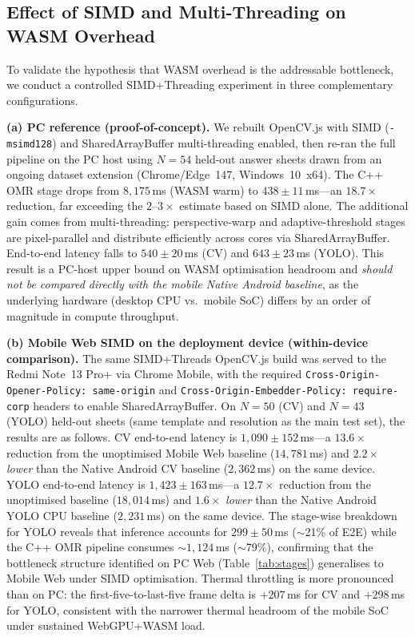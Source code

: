 \documentclass[conference]{IEEEtran}
\begin{document}
\FloatBarrier
\subsection{Effect of SIMD and Multi-Threading on WASM Overhead}

To validate the hypothesis that WASM overhead is the addressable
bottleneck, we conduct a controlled SIMD+Threading experiment in
three complementary configurations.

\textbf{(a) PC reference (proof-of-concept).}
We rebuilt OpenCV.js with SIMD (\texttt{-msimd128}) and
SharedArrayBuffer multi-threading enabled, then re-ran the full
pipeline on the PC host using $N=54$ held-out answer sheets drawn
from an ongoing dataset extension (Chrome/Edge~147, Windows~10~x64).
The C++ OMR stage drops from $8{,}175$\,ms (WASM warm) to
$438\pm11$\,ms---an $\mathbf{18.7\times}$ reduction, far exceeding
the $2$--$3\times$ estimate based on SIMD alone.
The additional gain comes from multi-threading: perspective-warp and
adaptive-threshold stages are pixel-parallel and distribute efficiently
across cores via SharedArrayBuffer.
End-to-end latency falls to $540\pm20$\,ms (CV) and $643\pm23$\,ms
(YOLO).
This result is a PC-host upper bound on WASM optimisation headroom and
\emph{should not be compared directly with the mobile Native Android
baseline}, as the underlying hardware (desktop CPU vs.\ mobile SoC)
differs by an order of magnitude in compute throughput.

\textbf{(b) Mobile Web SIMD on the deployment device (within-device comparison).}
The same SIMD+Threads OpenCV.js build was served to the Redmi Note~13
Pro+ via Chrome Mobile, with the required
\texttt{Cross-Origin-Opener-Policy: same-origin} and
\texttt{Cross-Origin-Embedder-Policy: require-corp} headers to enable
SharedArrayBuffer.
On $N=50$ (CV) and $N=43$ (YOLO) held-out sheets (same template and
resolution as the main test set), the results are as follows.
CV end-to-end latency is $1{,}090\pm152$\,ms---a
$\mathbf{13.6\times}$ reduction from the unoptimised Mobile Web
baseline ($14{,}781$\,ms) and $2.2\times$ \emph{lower} than the
Native Android CV baseline ($2{,}362$\,ms) on the same device.
YOLO end-to-end latency is $1{,}423\pm163$\,ms---a
$\mathbf{12.7\times}$ reduction from the unoptimised baseline
($18{,}014$\,ms) and $1.6\times$ \emph{lower} than the Native
Android YOLO CPU baseline ($2{,}231$\,ms) on the same device.
The stage-wise breakdown for YOLO reveals that inference accounts for
$299\pm50$\,ms ($\sim$21\% of E2E) while the C++ OMR pipeline consumes
${\sim}1{,}124$\,ms ($\sim$79\%), confirming that the bottleneck
structure identified on PC Web (Table~\ref{tab:stages}) generalises
to Mobile Web under SIMD optimisation.
Thermal throttling is more pronounced than on PC: the first-five-to-last-five
frame delta is $+207$\,ms for CV and $+298$\,ms for YOLO, consistent
with the narrower thermal headroom of the mobile SoC under sustained
WebGPU+WASM load.
\end{document}
